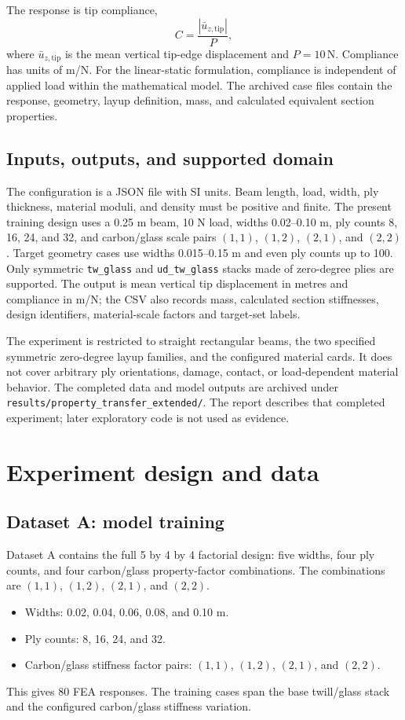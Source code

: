 \documentclass[11pt]{article}
\begin{document}
The response is tip compliance,
\begin{equation}
 C=\frac{|\bar{u}_{z,\mathrm{tip}}|}{P},
\end{equation}
where $\bar{u}_{z,\mathrm{tip}}$ is the mean vertical tip-edge displacement and $P=10\,\mathrm{N}$. Compliance has units of m/N. For the linear-static formulation, compliance is independent of applied load within the mathematical model. The archived case files contain the response, geometry, layup definition, mass, and calculated equivalent section properties.

\subsection{Inputs, outputs, and supported domain}
The configuration is a JSON file with SI units. Beam length, load, width, ply thickness, material moduli, and density must be positive and finite. The present training design uses a 0.25 m beam, 10 N load, widths 0.02--0.10 m, ply counts 8, 16, 24, and 32, and carbon/glass scale pairs $(1,1)$, $(1,2)$, $(2,1)$, and $(2,2)$. Target geometry cases use widths 0.015--0.15 m and even ply counts up to 100. Only symmetric \texttt{tw\_glass} and \texttt{ud\_tw\_glass} stacks made of zero-degree plies are supported. The output is mean vertical tip displacement in metres and compliance in m/N; the CSV also records mass, calculated section stiffnesses, design identifiers, material-scale factors and target-set labels.

The experiment is restricted to straight rectangular beams, the two specified symmetric zero-degree layup families, and the configured material cards. It does not cover arbitrary ply orientations, damage, contact, or load-dependent material behavior. The completed data and model outputs are archived under \texttt{results/property\_transfer\_extended/}. The report describes that completed experiment; later exploratory code is not used as evidence.

\section{Experiment design and data}
\subsection{Dataset A: model training}
Dataset A contains the full 5 by 4 by 4 factorial design: five widths, four ply counts, and four carbon/glass property-factor combinations. The combinations are $(1,1)$, $(1,2)$, $(2,1)$, and $(2,2)$.
\begin{itemize}
\item Widths: 0.02, 0.04, 0.06, 0.08, and 0.10 m.
\item Ply counts: 8, 16, 24, and 32.
\item Carbon/glass stiffness factor pairs: $(1,1)$, $(1,2)$, $(2,1)$, and $(2,2)$.
\end{itemize}
This gives 80 FEA responses. The training cases span the base twill/glass stack and the configured carbon/glass stiffness variation.
\end{document}
